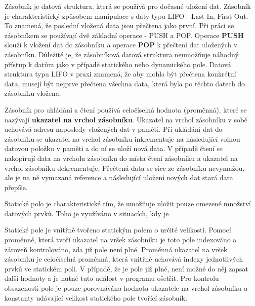 \vskip 4mm
\centerline{}
\vskip 4mm


Zásobník je datová struktura, která se používá pro dočasné uložení dat. Zásobník je charakteristický způsobem manipulace s daty typu LIFO - Last In, First Out. To znamená, že poslední vložená data jsou přečtena jako první. Při práci se zásobníkem se používají dvě základní operace - PUSH a POP. Operace {\bf PUSH} slouží k vložení dat do zásobníku a operace {\bf POP} k přečtení dat uložených v zásobníku. Důležité je, že zásobníková datová struktura neumožňuje náhodný přístup k datům jako v případě statického nebo dynamického pole. Datová struktura typu LIFO v praxi znamená, že aby mohla být přečtena konkrétní data, musejí být nejprve přečtena všechna data, která byla po těchto datech do zásobníku vložena.

\vskip 4mm
\centerline{}
\vskip 4mm

Zásobník pro ukládání a čtení používá celočíselná hodnota (proměnná), které se nazývají {\bf ukazatel na vrchol zásobníku}. Ukazatel na vrchol zásobníku v sobě uchovává adresu naposledy vložených dat v paměti. Při ukládání dat do zásobníku se ukazatel na vrchol zásobníku inkrementuje na následující volnou datovou položku v paměti a do ní se uloží nová data. V případě čtení se nakopírují data na vrcholu zásobníku do místa čtení zásobníku a ukazatel na vrchol zásobníku dekrementuje. Přečtená data se sice ze zásobníku nevymažou, ale je na ně vymazaná reference a následující uložení nových dat stará data přepíše. 

Statické polo je charakteristické tím, že umožňuje uložit pouze omezené množství datových prvků. Toho je využíváno v situacích, kdy je %


Statické pole je vnitřně tvořeno statickým polem o určité velikosti. Pomocí proměnné, která tvoří ukazatel na vršek zásobníku je toto pole indexováno a zároveň kontrolováno, zda již pole není plné. Proměnná ukazatel na vršek zásobníku je celočíselná proměnná, která vnitřně uchovává indexy jednotlivých prvků ve statickém poli. V případě, že je pole již plné, není možné do něj zapsat další hodnoty a je nutné tuto událost v programu ošetřit. Pro kontrolu obsazenosti pole je pouze porovnávána hodnota ukazatele na vrchol zásobníku a konstanty udávající velikost statického pole tvořící zásobník.


